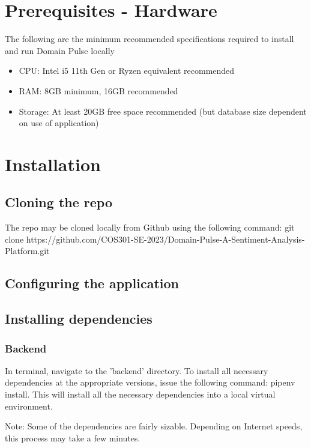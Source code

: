 \documentclass{article}
\begin{document}
\section{Prerequisites - Hardware}
The following are the minimum recommended specifications required to install and run Domain Pulse locally
\begin{itemize}
    \item CPU: Intel i5 11th Gen or Ryzen equivalent recommended
    \item RAM: 8GB minimum, 16GB recommended
    \item Storage: At least 20GB free space recommended (but database size dependent on use of application)
\end{itemize}


\section{Installation}

\subsection{Cloning the repo}
The repo may be cloned locally from Github using the following command: git clone https://github.com/COS301-SE-2023/Domain-Pulse-A-Sentiment-Analysis-Platform.git


\subsection{Configuring the application}


\subsection{Installing dependencies}
\subsubsection{Backend}
In terminal, navigate to the 'backend' directory. To install all necessary dependencies at the appropriate versions, issue the following
command: pipenv install. This will install all the necessary dependencies into a local virtual environment.

Note: Some of the dependencies are fairly sizable. Depending on Internet speeds, this process may take a few minutes.
\end{document}
